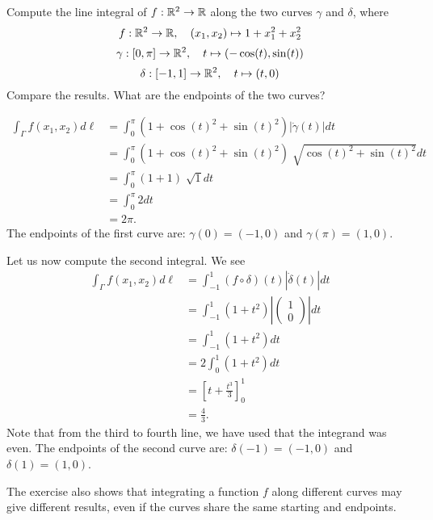 \documentclass[11pt]{article}
\begin{document}
\begin{exercise}
    Compute the line integral of $f : \mathbb{R}^2 \rightarrow \mathbb{R}$ along the two curves $\gamma$ and $\delta$, 
    where 
    \[
        f : \mathbb{R}^2 \to \mathbb{R}, \quad (x_1,x_2) \mapsto 1 + x_1^2 + x_2^2
    \]
    \[
        \gamma : [0,\pi] \rightarrow \mathbb{R}^2, \quad t \mapsto ( -\cos(t), \sin(t) )
    \]
    \[
        \delta : [-1,1] \rightarrow \mathbb{R}^2, \quad t \mapsto (t,0)
    \]
    Compare the results. What are the endpoints of the two curves? 
\end{exercise}
\begin{solution}     
    \begin{align*}
        \int_{\Gamma} f(x_1,x_2) d\ell 
        &= \int_{0}^{\pi} ( 1 + \cos(t)^2 + \sin(t)^2 ) |\dot{\gamma}(t)|dt\\
        &= \int_{0}^{\pi} ( 1 + \cos(t)^2 + \sin(t)^2 ) \sqrt[]{\cos(t)^2 + \sin(t)^2} dt\\
        &= \int_{0}^{\pi} ( 1 + 1 ) \sqrt[]{1} dt\\
        &= \int_{0}^{\pi} 2 dt\\
        &= 2\pi.
    \end{align*}
    The endpoints of the first curve are: $\gamma(0) = (-1,0)$ and $\gamma(\pi) = (1,0)$.

    Let us now compute the second integral. We see 
    \begin{align*}
        \int_{\Gamma} f(x_1,x_2) d\ell 
        &= \int_{-1}^{1} (f\circ \delta)(t)|\dot{\delta}(t)|dt\\
        &= \int_{-1}^1 (1+t^2)\left|\begin{pmatrix}1\\0\end{pmatrix}\right| dt\\
        &= \int_{-1}^1 (1+t^2) dt\\
        &= 2 \int_{0}^1 (1+t^2) dt\\
        &= \left[t+\frac{t^3}{3} \right]_{0}^{1}\\
        &= \frac 4 3.
    \end{align*}
    Note that from the third to fourth line, we have used that the integrand was even. 
    The endpoints of the second curve are: $\delta(-1) = (-1,0)$ and $\delta(1) = (1,0)$.

    The exercise also shows that integrating a function $f$ along different curves may give different results, 
    even if the curves share the same starting and endpoints. 
\end{solution}
\end{document}
